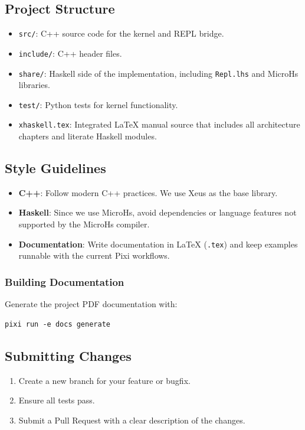 \documentclass[11pt]{scrartcl}
\begin{document}
\subsection{Project Structure}


\begin{itemize}
\item \texttt{src/}: C++ source code for the kernel and REPL bridge.
\item \texttt{include/}: C++ header files.
\item \texttt{share/}: Haskell side of the implementation, including \texttt{Repl.lhs} and MicroHs libraries.
\item \texttt{test/}: Python tests for kernel functionality.
\item \texttt{xhaskell.tex}: Integrated LaTeX manual source that includes all architecture chapters and literate Haskell modules.
\end{itemize}


\subsection{Style Guidelines}


\begin{itemize}
\item \textbf{C++}: Follow modern C++ practices. We use Xeus as the base library.
\item \textbf{Haskell}: Since we use MicroHs, avoid dependencies or language features not supported by the MicroHs compiler.
\item \textbf{Documentation}: Write documentation in LaTeX (\texttt{.tex}) and keep examples runnable with the current Pixi workflows.
\end{itemize}

\subsubsection{Building Documentation}

Generate the project PDF documentation with:
\begin{verbatim}
pixi run -e docs generate
\end{verbatim}


\subsection{Submitting Changes}


\begin{enumerate}
\item Create a new branch for your feature or bugfix.
\item Ensure all tests pass.
\item Submit a Pull Request with a clear description of the changes.
\end{enumerate}
\end{document}

